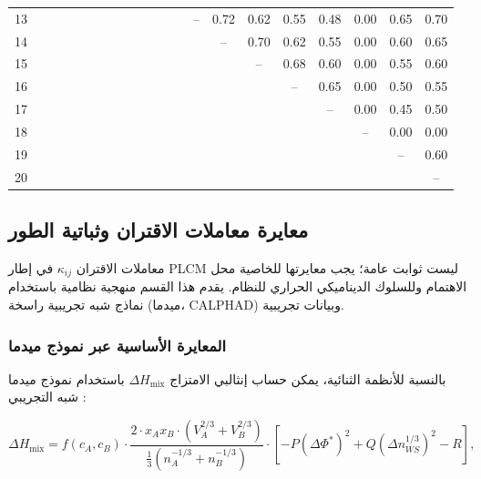 \documentclass[11pt,a4paper]{article}
\begin{document}
\begin{otherlanguage}{arabic}
{\begin{longtable}{c|*{20}{c}}
				13 &   &   &   &   &   &   &   &   &   &   &   &   & – & 0.72 & 0.62 & 0.55 & 0.48 & 0.00 & 0.65 & 0.70 \\
				14 &   &   &   &   &   &   &   &   &   &   &   &   &   & – & 0.70 & 0.62 & 0.55 & 0.00 & 0.60 & 0.65 \\
				15 &   &   &   &   &   &   &   &   &   &   &   &   &   &   & – & 0.68 & 0.60 & 0.00 & 0.55 & 0.60 \\
				16 &   &   &   &   &   &   &   &   &   &   &   &   &   &   &   & – & 0.65 & 0.00 & 0.50 & 0.55 \\
				17 &   &   &   &   &   &   &   &   &   &   &   &   &   &   &   &   & – & 0.00 & 0.45 & 0.50 \\
				18 &   &   &   &   &   &   &   &   &   &   &   &   &   &   &   &   &   & – & 0.00 & 0.00 \\
				19 &   &   &   &   &   &   &   &   &   &   &   &   &   &   &   &   &   &   & – & 0.60 \\
				20 &   &   &   &   &   &   &   &   &   &   &   &   &   &   &   &   &   &   &   & – \\
				\bottomrule
		\end{longtable}}
		
		\subsection{معايرة معاملات الاقتران وثباتية الطور}
		\label{subsec:calibration}
		
		معاملات الاقتران \(\kappa_{ij}\) في إطار PLCM ليست ثوابت عامة؛ يجب معايرتها للخاصية محل الاهتمام وللسلوك الديناميكي الحراري للنظام. يقدم هذا القسم منهجية نظامية باستخدام نماذج شبه تجريبية راسخة (ميدما، CALPHAD) وبيانات تجريبية.
		
		\subsubsection{المعايرة الأساسية عبر نموذج ميدما}
		
		بالنسبة للأنظمة الثنائية، يمكن حساب إنثالبي الامتزاج \(\Delta H_{\text{mix}}\) باستخدام نموذج ميدما شبه التجريبي \cite{Miedema1980, Takeuchi2010}:
		
		\begin{equation}
			\Delta H_{\text{mix}} = f(c_A, c_B) \cdot \frac{2 \cdot x_A x_B \cdot (V_A^{2/3} + V_B^{2/3})}{\frac{1}{3}(n_A^{-1/3} + n_B^{-1/3})}
			\cdot \left[ -P (\Delta \Phi^*)^2 + Q (\Delta n_{WS}^{1/3})^2 - R \right],
			\label{eq:miedema}
		\end{equation}
		

\end{otherlanguage}
\end{document}
